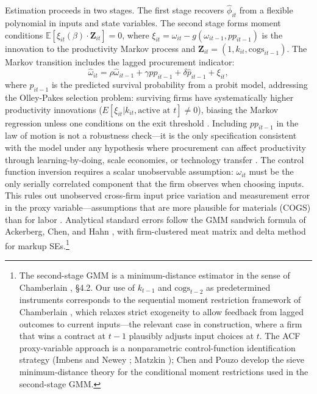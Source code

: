 \documentclass[11pt]{article}
\newcommand{\E}{\mathbb{E}}
\begin{document}
Estimation proceeds in two stages. The first stage recovers $\hat{\phi}_{it}$ from a flexible polynomial in inputs and state variables. The second stage forms moment conditions $\E[\xi_{it}(\beta) \cdot \mathbf{Z}_{it}] = 0$, where $\xi_{it} = \omega_{it} - g(\omega_{it-1}, pp_{it-1})$ is the innovation to the productivity Markov process and $\mathbf{Z}_{it} = (1, k_{it}, \text{cogs}_{it-1})$. The Markov transition includes the lagged procurement indicator:
\begin{equation}
    \hat{\omega}_{it} = \rho \hat{\omega}_{it-1} + \gamma pp_{it-1} + \delta \hat{p}_{it-1} + \xi_{it},
\end{equation}
where $\hat{p}_{it-1}$ is the predicted survival probability from a probit model, addressing the Olley-Pakes selection problem: surviving firms have systematically higher productivity innovations ($E[\xi_{it} | k_{it}, \text{active at } t] \neq 0$), biasing the Markov regression unless one conditions on the exit threshold \cite{OlleyPakes1996}. Including $pp_{it-1}$ in the law of motion is not a robustness check---it is the only specification consistent with the model under any hypothesis where procurement can affect productivity through learning-by-doing, scale economies, or technology transfer \cite{DeLoecker2013,DLS2021}. The control function inversion requires a scalar unobservable assumption: $\omega_{it}$ must be the only serially correlated component that the firm observes when choosing inputs. This rules out unobserved cross-firm input price variation and measurement error in the proxy variable---assumptions that are more plausible for materials (COGS) than for labor \cite{DGM2026}. Analytical standard errors follow the GMM sandwich formula of Ackerberg, Chen, and Hahn \cite{ACH2012}, with firm-clustered meat matrix and delta method for markup SEs.\footnote{The second-stage GMM is a minimum-distance estimator in the sense of Chamberlain \cite{Chamberlain1984}, \S4.2. Our use of $k_{t-1}$ and $\text{cogs}_{t-2}$ as predetermined instruments corresponds to the sequential moment restriction framework of Chamberlain \cite{Chamberlain2022}, which relaxes strict exogeneity to allow feedback from lagged outcomes to current inputs---the relevant case in construction, where a firm that wins a contract at $t{-}1$ plausibly adjusts input choices at $t$. The ACF proxy-variable approach is a nonparametric control-function identification strategy (Imbens and Newey \cite{ImbensNewey2009}; Matzkin \cite{Matzkin2003}); Chen and Pouzo \cite{ChenPouzo2012,ChenPouzo2015} develop the sieve minimum-distance theory for the conditional moment restrictions used in the second-stage GMM.}
\end{document}
